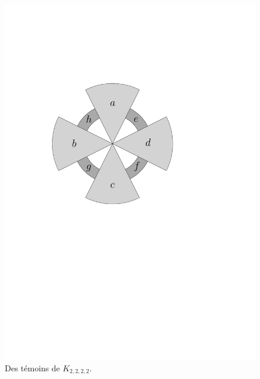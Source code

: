 \documentclass{scrartcl}
\begin{document}
\begin{flushleft}
\begin{figure}[h]
    \caption{Des témoins de $K_{2,2,2,2}$.}\label{witnK2222}
    \begin{center}
        \includegraphics[page=\ipeFigfirsttemoinquatriparti, scale = 0.5]{figs}
        \hspace*{2cm}

\end{center}
\end{figure}
\end{flushleft}
\end{document}
